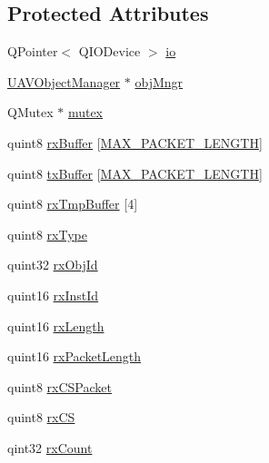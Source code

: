 \subsection*{Protected Attributes}
\begin{DoxyCompactItemize}
\item 
Q\-Pointer$<$ Q\-I\-O\-Device $>$ \hyperlink{group___u_a_v_talk_plugin_ga0047f38af98ba4de8e38500e10b73046}{io}
\item 
\hyperlink{class_u_a_v_object_manager}{U\-A\-V\-Object\-Manager} $\ast$ \hyperlink{group___u_a_v_talk_plugin_ga096422f1ff46ea45de07a92c41827aa5}{obj\-Mngr}
\item 
Q\-Mutex $\ast$ \hyperlink{group___u_a_v_talk_plugin_ga2dea39cdabf26ef85d0b26583e21e60b}{mutex}
\item 
quint8 \hyperlink{group___u_a_v_talk_plugin_ga612e1b395a61ee81d90d8199ba789a86}{rx\-Buffer} \mbox{[}\hyperlink{group___u_a_v_talk_plugin_gab5a37286c5e8b676d49e134f26444a0c}{M\-A\-X\-\_\-\-P\-A\-C\-K\-E\-T\-\_\-\-L\-E\-N\-G\-T\-H}\mbox{]}
\item 
quint8 \hyperlink{group___u_a_v_talk_plugin_ga7f0eb8c42215b435a77b84d7ffdbbfc3}{tx\-Buffer} \mbox{[}\hyperlink{group___u_a_v_talk_plugin_gab5a37286c5e8b676d49e134f26444a0c}{M\-A\-X\-\_\-\-P\-A\-C\-K\-E\-T\-\_\-\-L\-E\-N\-G\-T\-H}\mbox{]}
\item 
quint8 \hyperlink{group___u_a_v_talk_plugin_ga94d59693bfbe92bf000ee85b559693e0}{rx\-Tmp\-Buffer} \mbox{[}4\mbox{]}
\item 
quint8 \hyperlink{group___u_a_v_talk_plugin_ga59962a309157ed27efad61d5bf85f650}{rx\-Type}
\item 
quint32 \hyperlink{group___u_a_v_talk_plugin_ga922e3ea36927c84023cfb0cf719c9aa0}{rx\-Obj\-Id}
\item 
quint16 \hyperlink{group___u_a_v_talk_plugin_ga72761110b9b683dad5615619c9323674}{rx\-Inst\-Id}
\item 
quint16 \hyperlink{group___u_a_v_talk_plugin_ga52cc4d0f063a520fcf7fc2a10254118b}{rx\-Length}
\item 
quint16 \hyperlink{group___u_a_v_talk_plugin_ga8ce408e2fe258de7a15c77540055a81d}{rx\-Packet\-Length}
\item 
quint8 \hyperlink{group___u_a_v_talk_plugin_gab6dc6fd77ce7d02c121d7c197dfdebd2}{rx\-C\-S\-Packet}
\item 
quint8 \hyperlink{group___u_a_v_talk_plugin_gabfde70d24df43bcff2ab3c3da3f2444f}{rx\-C\-S}
\item 
qint32 \hyperlink{group___u_a_v_talk_plugin_ga380dea6ca845f80612070ed17ea65655}{rx\-Count}

\end{DoxyCompactItemize}
